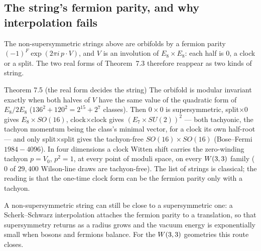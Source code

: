\subsection{The string's fermion parity, and why interpolation fails}
\label{sec:interp}

The non-supersymmetric strings above are orbifolds by a fermion parity $(-1)^F\exp(2\pi i\,p\cdot V)$, and $V$ is an involution of
$E_8\times E_8$: each half is $0$, a clock or a split. The two real forms of Theorem~7.3 therefore reappear as two kinds of string.

\begin{result}{Theorem 7.5 (the real form decides the string) \hfill \tierC}
The orbifold is modular invariant exactly when both halves of $V$ have the same value of the quadratic form of $E_8/2E_8$
($136^2+120^2=2^{15}+2^7$ classes). Then $0\times0$ is supersymmetric, split$\times0$ gives $E_8\times SO(16)$, clock$\times$clock gives
$(E_7\times SU(2))^2$ --- both tachyonic, the tachyon momentum being the class's minimal vector, for a clock its own half-root --- and
only split$\times$split gives the tachyon-free $SO(16)\times SO(16)$ (Bose--Fermi $1984-4096$). In four dimensions a clock Witten
shift carries the zero-winding tachyon $p=V_0$, $p^2=1$, at every point of moduli space, on every $W(3,3)$ family ($0$ of $29{,}400$
Wilson-line draws are tachyon-free). The list of strings is classical; the reading is that the one-time clock form can be the
fermion parity only with a tachyon.  
\end{result}

A non-supersymmetric string can still be close to a supersymmetric one: a Scherk--Schwarz interpolation attaches the fermion parity
to a translation, so that supersymmetry returns as a radius grows and the vacuum energy is exponentially small when bosons and
fermions balance. For the $W(3,3)$ geometries this route closes.

